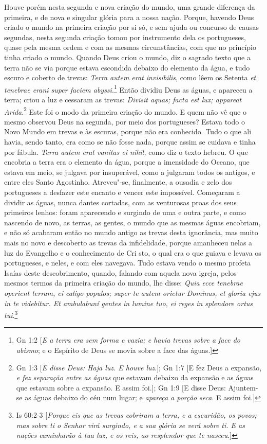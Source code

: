 Houve porém nesta segunda e nova criação do mundo, uma grande diferença
da primeira, e de nova e singular glória para a nossa nação. Porque,
havendo Deus criado o mundo na primeira criação por si só, e sem ajuda
ou concurso de causas segundas, nesta segunda criação tomou por
instrumento dela os portugueses, quase pela mesma ordem e com as mesmas
circunstâncias, com que no princípio tinha criado o mundo.
Quando Deus criou o mundo, diz o sagrado texto que a terra não se via
porque estava escondida debaixo do elemento da água, e tudo escuro e
coberto de trevas: \emph{Terra autem erat invisibilis}, como lêem os
Setenta \emph{et tenebrae erani super faciem abyssi}.\footnote{Gn 1:2 [\emph{E a terra era sem forma e vazia; e havia trevas sobre a face do abismo}; e o Espírito de Deus
se movia sobre a face das águas.]} Então dividiu Deus as águas, e apareceu a terra; criou a luz e cessaram as trevas: \emph{Divisit aquas;
facta est lux; appareat Arida}.\footnote{Gn 1:3 [\emph{E disse Deus: Haja luz. E houve luz}.]; Gn 1:7 [E fez Deus a expansão, \emph{e fez separação
entre as águas} que estavam debaixo da expansão e as águas que estavam sobre a expansão. E
assim foi.]; Gn 1:9 [E disse Deus: Ajuntem-se as águas debaixo do céu num lugar; e \emph{apareça a porção seca}. E assim foi.]} Este foi o modo da
primeira criação do mundo. E quem não vê que o mesmo observou Deus na
segunda, por meio
dos portugueses? Estava todo o Novo Mundo em trevas e às escuras, porque
não era conhecido. Tudo o que ali havia, sendo tanto, era como se não
fosse nada, porque assim se cuidava e tinha por fábula. \emph{Terra
autem erat vanitas ei nihil,} como diz o texto hebreu.
O que encobria a terra era o elemento da água, porque a
imensidade do Oceano, que estava em meio, se julgava por insuperável,
como a julgaram todos os antigos, e entre eles Santo Agostinho.
Atreveu"-se, finalmente, a ousadia e zelo dos portugueses a desfazer este
encanto e vencer este impossível. Começaram a dividir as águas, nunca
dantes cortadas, com as venturosas proas dos seus primeiros lenhos:
foram aparecendo e surgindo de uma e outra parte, e como nascendo de
novo, as terras, as gentes, o mundo que as mesmas águas encobriam, e não
só acabaram então no mundo antigo as trevas desta ignorância, mas muito
mais no novo e descoberto as trevas da infidelidade, porque amanheceu
nelas a luz do Evangelho e o conhecimento de Cri sto, o qual era o que
guiava e levava os portugueses, e neles, e com eles navegava. Tudo
estava vendo o mesmo profeta Isaías deste descobrimento, quando, falando
com aquela nova igreja, pelos mesmos termos da primeira criação do
mundo, lhe disse: \emph{Quia ecce tenebrae operient terram, ei caligo
populos; super te autem orietur Dominus, et gloria ejus in te videbitur.
Et ambulabuní gentes in lumine tuo, ei reges in splendore ortus
tui}.\footnote{Is 60:2-3 [\emph{Porque eis que as trevas cobriram a terra, e a escuridão, os povos; mas sobre ti o Senhor virá surgindo, e a sua glória se verá sobre ti. E as nações caminharão à tua luz, e os reis, ao resplendor que te nasceu}.]}

